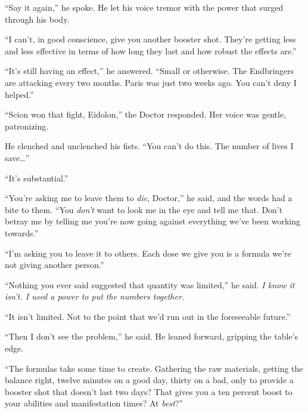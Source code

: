 ``Say it again,'' he spoke.  He let his voice tremor with the power that surged through his body.



``I can't, in good conscience, give you another booster shot.  They're getting less and less effective in terms of how long they last and how robust the effects are.''



``It's still having an effect,'' he answered.  ``Small or otherwise.  The Endbringers are attacking every two months.  Paris was just two weeks ago.  You can't deny I helped.''



``Scion won that fight, Eidolon,'' the Doctor responded.  Her voice was gentle, patronizing.



He clenched and unclenched his fists.  ``You can't do this.  The number of lives I save\ldots''



``It's substantial.''



``You're asking me to leave them to \emph{die}, Doctor,'' he said, and the words had a bite to them.  ``You \emph{don't} want to look me in the eye and tell me that.  Don't betray me by telling me you're now going against everything we've been working towards.''



``I'm asking you to leave it to others.  Each dose we give you is a formula we're not giving another person.''



``Nothing you ever said suggested that quantity was limited,'' he said.  \emph{I know it isn't.  I used a power to put the numbers together.}



``It isn't limited.  Not to the point that we'd run out in the foreseeable future.''



``Then I don't see the problem,'' he said.  He leaned forward, gripping the table's edge.



``The formulas take some time to create.  Gathering the raw materials, getting the balance right, twelve minutes on a good day, thirty on a bad, only to provide a booster shot that doesn't last two days?  That gives you a ten percent boost to your abilities and manifestation times?  At \emph{best}?''



